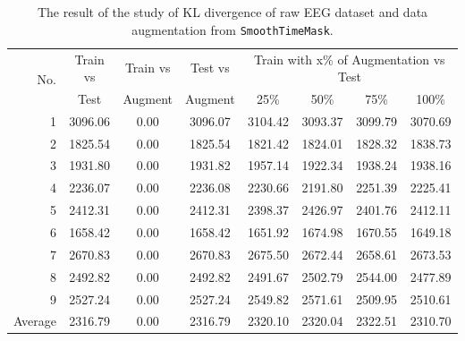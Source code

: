 \begin{table}[ht!]
    \centering
    \caption[The result of KL divergence]{The result of the study of KL divergence of raw EEG dataset and data augmentation from \texttt{SmoothTimeMask}.}
    \label{tab:KL-SmoothTimeMask}
        {\small\begin{tabular}{rccccccc}
        \hline
        \multirow{2}{*}{No.} & Train vs & Train vs & Test vs & \multicolumn{4}{c}{Train with x\% of Augmentation vs Test} \\ 
        \cline{5-8} 
                             & Test     & Augment  & Augment & 25\%          & 50\%         & 75\%         & 100\%        \\
        \hline
        1                    & 3096.06  & 0.00     & 3096.07 & 3104.42       & 3093.37      & 3099.79      & 3070.69      \\
        2                    & 1825.54  & 0.00     & 1825.54 & 1821.42       & 1824.01      & 1828.32      & 1838.73      \\
        3                    & 1931.80  & 0.00     & 1931.82 & 1957.14       & 1922.34      & 1938.24      & 1938.16      \\
        4                    & 2236.07  & 0.00     & 2236.08 & 2230.66       & 2191.80      & 2251.39      & 2225.41      \\
        5                    & 2412.31  & 0.00     & 2412.31 & 2398.37       & 2426.97      & 2401.76      & 2412.11      \\
        6                    & 1658.42  & 0.00     & 1658.42 & 1651.92       & 1674.98      & 1670.55      & 1649.18      \\
        7                    & 2670.83  & 0.00     & 2670.83 & 2675.50       & 2672.44      & 2658.61      & 2673.53      \\
        8                    & 2492.82  & 0.00     & 2492.82 & 2491.67       & 2502.79      & 2544.00      & 2477.89      \\
        9                    & 2527.24  & 0.00     & 2527.24 & 2549.82       & 2571.61      & 2509.95      & 2510.61      \\\hline
        Average              & 2316.79  & 0.00     & 2316.79 & 2320.10       & 2320.04      & 2322.51      & 2310.70      \\
        \hline
        \end{tabular}}
\end{table}

